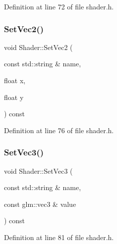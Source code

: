 Definition at line 72 of file shader.\+h.

\mbox{\label{class_shader_a7152c472e8d452a91789244726aacbaf}} 
\subsubsection{\texorpdfstring{SetVec2()}{SetVec2()}\hspace{0.1cm}{\footnotesize\ttfamily [2/2]}}
{\footnotesize\ttfamily void Shader\+::\+Set\+Vec2 (\begin{DoxyParamCaption}\item[{const std\+::string \&}]{name,  }\item[{float}]{x,  }\item[{float}]{y }\end{DoxyParamCaption}) const\hspace{0.3cm}{\ttfamily [inline]}}



Definition at line 76 of file shader.\+h.

\mbox{\label{class_shader_a8d1456b390875e5a99e70a658a4dfdd3}} 
\subsubsection{\texorpdfstring{SetVec3()}{SetVec3()}\hspace{0.1cm}{\footnotesize\ttfamily [1/2]}}
{\footnotesize\ttfamily void Shader\+::\+Set\+Vec3 (\begin{DoxyParamCaption}\item[{const std\+::string \&}]{name,  }\item[{const glm\+::vec3 \&}]{value }\end{DoxyParamCaption}) const\hspace{0.3cm}{\ttfamily [inline]}}



Definition at line 81 of file shader.\+h.

\mbox{\label{class_shader_a685cbffc1eec6ae40fe103a8fcc2aaaf}} 
